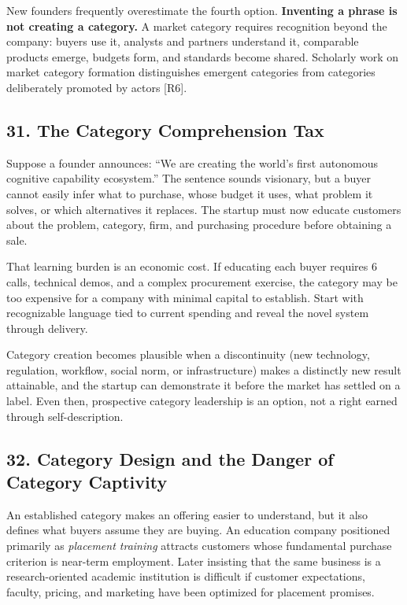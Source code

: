 New founders frequently overestimate the fourth option. \textbf{Inventing a phrase is not creating a category.} A market category requires recognition beyond the company: buyers use it, analysts and partners understand it, comparable products emerge, budgets form, and standards become shared. Scholarly work on market category formation distinguishes emergent categories from categories deliberately promoted by actors [R6].

\subsection*{31. The Category Comprehension Tax}

Suppose a founder announces: ``We are creating the world's first autonomous cognitive capability ecosystem.'' The sentence sounds visionary, but a buyer cannot easily infer what to purchase, whose budget it uses, what problem it solves, or which alternatives it replaces. The startup must now educate customers about the problem, category, firm, and purchasing procedure before obtaining a sale.

That learning burden is an economic cost. If educating each buyer requires 6 calls, technical demos, and a complex procurement exercise, the category may be too expensive for a company with minimal capital to establish. Start with recognizable language tied to current spending and reveal the novel system through delivery.

Category creation becomes plausible when a discontinuity (new technology, regulation, workflow, social norm, or infrastructure) makes a distinctly new result attainable, and the startup can demonstrate it before the market has settled on a label. Even then, prospective category leadership is an option, not a right earned through self-description.

\subsection*{32. Category Design and the Danger of Category Captivity}

An established category makes an offering easier to understand, but it also defines what buyers assume they are buying. An education company positioned primarily as \emph{placement training} attracts customers whose fundamental purchase criterion is near-term employment. Later insisting that the same business is a research-oriented academic institution is difficult if customer expectations, faculty, pricing, and marketing have been optimized for placement promises.

